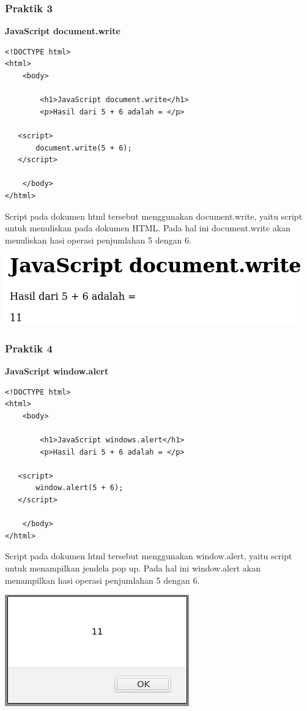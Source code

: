 \documentclass[a4paper,12pt]{article}
\begin{document}
\subsubsection{Praktik 3}
\textbf{JavaScript document.write\\}
\begin{lstlisting}
<!DOCTYPE html>
<html>
    <body>

        <h1>JavaScript document.write</h1>
        <p>Hasil dari 5 + 6 adalah = </p>

   <script>
       document.write(5 + 6);
   </script>

    </body>
</html>
\end{lstlisting}
Script pada dokumen html tersebut menggunakan document.write, yaitu script untuk menuliskan pada dokumen HTML. Pada hal
ini document.write akan menuliskan hasi operasi penjumlahan 5 dengan 6.
\begin{center}
    \includegraphics[width=.8\linewidth]{2.png} 
\end{center}

\subsubsection{Praktik 4}
\textbf{JavaScript window.alert\\}
\begin{lstlisting}
<!DOCTYPE html>
<html>
    <body>

        <h1>JavaScript windows.alert</h1>
        <p>Hasil dari 5 + 6 adalah = </p>

   <script>
       window.alert(5 + 6);
   </script>

    </body>
</html>
\end{lstlisting}
Script pada dokumen html tersebut menggunakan window.alert, yaitu script untuk menampilkan jendela pop up. Pada hal
ini window.alert akan menampilkan hasi operasi penjumlahan 5 dengan 6.
\begin{center}
    \includegraphics[scale=.7]{3.png} 
\end{center}
\end{document}
